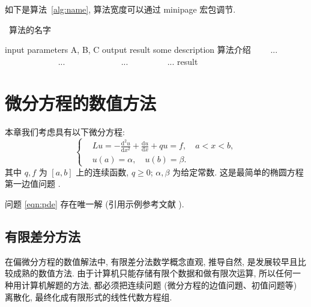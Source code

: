 \documentclass[openany,twoside,12pt]{book}
\theoremstyle{plain}
\begin{document}
如下是算法~\ref{alg:name}, 算法宽度可以通过 minipage 宏包调节.
\begin{center}
\vspace{-2ex}
\begin{minipage}{.9\linewidth}
\begin{algorithm}[H]
\caption{~算法的名字}\label{alg:name}  %
\begin{algorithmic}[1]
\Require  input parameters A, B, C  %
\Ensure  output result   %
\State some description 算法介绍   %
　　\State ...
　　　　\State ...
　　\Else
　　　　\State ...
　　\EndIf
\EndFor
{}  %
　　\State ...
\EndWhile
\State \Return result
\end{algorithmic}
\end{algorithm}
\end{minipage}
\end{center}




\chapter{微分方程的数值方法}

本章我们考虑具有以下微分方程:
\begin{equation}\label{eqn:pde}
\left\{\begin{aligned}
& L u=-\frac{\mathrm{d}^{2} u}{\mathrm{d} x^{2}}+\frac{\mathrm{d} u}{\mathrm{d} x}+q u=f, \quad a < x < b, \\
& u(a)=\alpha, \quad u(b)=\beta.
\end{aligned}\right.
\end{equation}
其中 $q, f$ 为 $[a,b]$ 上的连续函数, $q \geqslant 0$; $\alpha, \beta$ 为给定常数. 这是最简单的椭圆方程第一边值问题 .

问题 \eqref{eqn:pde} 存在唯一解 (引用示例参考文献 \cite{LiLiu1997}).


\section{有限差分方法}
在偏微分方程的数值解法中, 有限差分法数学概念直观, 推导自然, 是发展较早且比较成熟的数值方法. 由于计算机只能存储有限个数据和做有限次运算, 所以任何一种用计算机解题的方法, 都必须把连续问题 (微分方程的边值问題、初值问题等) 离散化, 最终化成有限形式的线性代数方程组.
\end{document}

